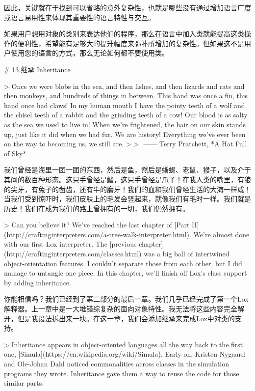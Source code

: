 \documentclass[cn,11pt,chinese]{elegantbook}
\begin{document}
因此，关键就在于找到可以省略的意外复杂性，也就是哪些没有通过增加语言广度或语言易用性来体现其重要性的语言特性与交互。

如果用户想用对象的类别来表达他们的程序，那么在语言中加入类就能提高这类操作的便利性，希望能有足够大的提升幅度来弥补所增加的复杂性。但如果这不是用户使用您的语言的方式，那么无论如何都不要使用类。

# 13.继承 Inheritance

> Once we were blobs in the sea, and then fishes, and then lizards and rats and then monkeys, and hundreds of things in between. This hand was once a fin, this hand once had claws! In my human mouth I have the pointy teeth of a wolf and the chisel teeth of a rabbit and the grinding teeth of a cow! Our blood is as salty as the sea we used to live in! When we’re frightened, the hair on our skin stands up, just like it did when we had fur. We are history! Everything we’ve ever been on the way to becoming us, we still are.
>
> ​																																		—— Terry Pratchett, *A Hat Full of Sky*

我们曾经是海里一团一团的东西，然后是鱼，然后是蜥蜴、老鼠、猴子，以及介于其间的数百种形态。这只手曾经是鳍，这只手曾经是爪子！在我人类的嘴里，有狼的尖牙，有兔子的凿齿，还有牛的磨牙！我们的血和我们曾经生活的大海一样咸！当我们受到惊吓时，我们皮肤上的毛发会竖起来，就像我们有毛时一样。我们就是历史！我们在成为我们的路上曾拥有的一切，我们仍然拥有。

> Can you believe it? We’ve reached the last chapter of [Part II](http://craftinginterpreters.com/a-tree-walk-interpreter.html). We’re almost done with our first Lox interpreter. The [previous chapter](http://craftinginterpreters.com/classes.html) was a big ball of intertwined object-orientation features. I couldn’t separate those from each other, but I did manage to untangle one piece. In this chapter, we’ll finish off Lox’s class support by adding inheritance.

你能相信吗？我们已经到了第二部分的最后一章。我们几乎已经完成了第一个Lox解释器。上一章中是一大堆错综复杂的面向对象特性。我无法将这些内容完全解开，但是我设法拆出来一块。在这一章，我们会添加继承来完成Lox中对类的支持。

> Inheritance appears in object-oriented languages all the way back to the first one, [Simula](https://en.wikipedia.org/wiki/Simula). Early on, Kristen Nygaard and Ole-Johan Dahl noticed commonalities across classes in the simulation programs they wrote. Inheritance gave them a way to reuse the code for those similar parts.
\end{document}
